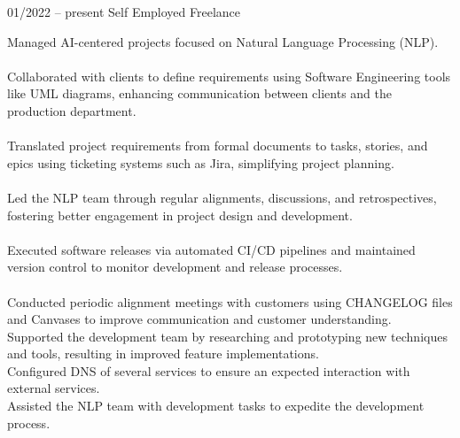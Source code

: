 \documentclass[9pt, green]{template/developercv} %
\begin{document}
{\begin{entrylist}
	\entry
{01/2022 -- present }
{}
{Self Employed \space\cpipe\space Freelance}
{
	\vspace{0.3mm}
	\begin{minipage}[t]{0.75\textwidth}				
		\vspace{-\baselineskip}
		\itemmarker Managed AI-centered projects focused on Natural Language Processing (NLP).\\
		\vspace{-3mm}\\
		\itemmarker Collaborated with clients to define requirements using Software Engineering tools like UML diagrams, enhancing communication between clients and the production department.\\
		\vspace{-3mm}\\
		\itemmarker Translated project requirements from formal documents to tasks, stories, and epics using ticketing systems such as Jira, simplifying project planning.\\
		\vspace{-3mm}\\
		\itemmarker Led the NLP team through regular alignments, discussions, and retrospectives, fostering better engagement in project design and development.\\
		\vspace{-3mm}\\
		\itemmarker Executed software releases via automated CI/CD pipelines and maintained version control to monitor development and release processes.\\
        \vspace{-3mm}\\
		\itemmarker Conducted periodic alignment meetings with customers using CHANGELOG files and Canvases to improve communication and customer understanding.\\
		\itemmarker Supported the development team by researching and prototyping new techniques and tools, resulting in improved feature implementations.\\
		\itemmarker Configured DNS of several services to ensure an expected interaction with external services.\\
		\itemmarker Assisted the NLP team with development tasks to expedite the development process.\\	
\vspace{-3mm}\\  
	\end{minipage}
	
}
\end{entrylist}}
\end{document}
